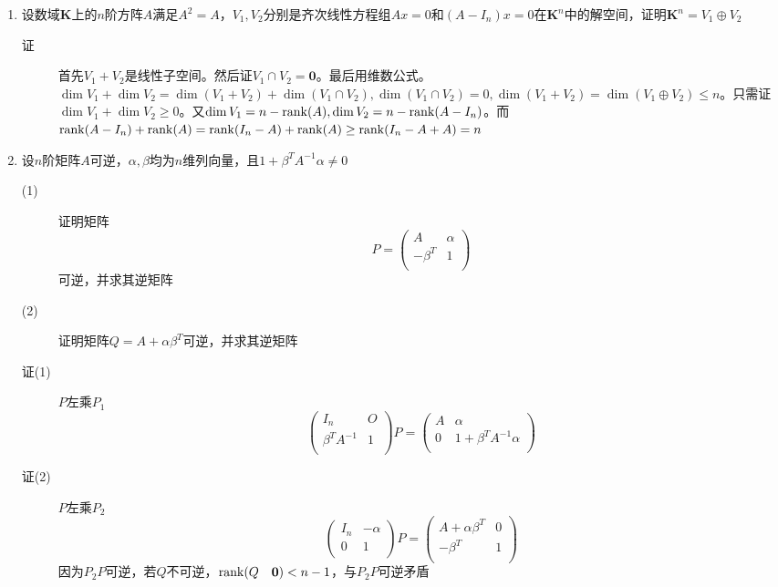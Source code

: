 \begin{enumerate}
\item 设数域$\mathbf{K}$上的$n$阶方阵$A$满足$A^2=A$，$V_1,V_2$分别是齐次线性方程组$Ax=0$和$(A-I_n)x=0$在$\mathbf{K}^n$中的解空间，证明$\mathbf{K}^n=V_1\oplus V_2$
\begin{description}
\item[证] 首先$V_1+V_2$是线性子空间。然后证$V_1\cap V_2 = \mathbf{0}$。最后用维数公式。
$\dim V_1+\dim V_2=\dim(V_1+V_2)+\dim(V_1 \cap V_2),\dim(V_1 \cap V_2)=0,\dim(V_1+V_2)=\dim(V_1\oplus V_2)\leq n$。只需证$\dim V_1+\dim V_2\geq 0$。又$\dim V_1=n-\operatorname{rank}(A),\dim V_2=n-\operatorname{rank}(A-I_n)$。而$\operatorname{rank}(A-I_n)+\operatorname{rank}(A)=\operatorname{rank}(I_n-A)+\operatorname{rank}(A) \geq \operatorname{rank}(I_n-A+A)=n$

\end{description}

\item 设$n$阶矩阵$A$可逆，$\alpha,\beta$均为$n$维列向量，且$1+\beta^TA^{-1}\alpha\neq 0$
\begin{description}
\item[(1)] 证明矩阵
\[
P=\left(
\begin{array}{cc}
A & \alpha\\
-\beta^T & 1\\
\end{array}\right)
\]
可逆，并求其逆矩阵
\item[(2)] 证明矩阵$Q=A+\alpha\beta^T$可逆，并求其逆矩阵
\item[证(1)] $P$左乘$P_1$
\[
\left(
\begin{array}{cc}
I_n & O \\
\beta^TA^{-1} & 1 \\
\end{array}\right)P = \left(
\begin{array}{cc}
A & \alpha \\
0 & 1+\beta^TA^{-1}\alpha \\
\end{array}\right)
\]
\item[证(2)] $P$左乘$P_2$
\[
\left(
\begin{array}{cc}
I_n & -\alpha \\
0 & 1 \\
\end{array}\right)P = \left(
\begin{array}{cc}
A+\alpha\beta^T & 0 \\
-\beta^T & 1 \\
\end{array}\right)
\]
因为$P_2P$可逆，若$Q$不可逆，$\operatorname{rank}(Q\quad\mathbf{0})<n-1$，与$P_2P$可逆矛盾
\end{description}


\end{enumerate}
